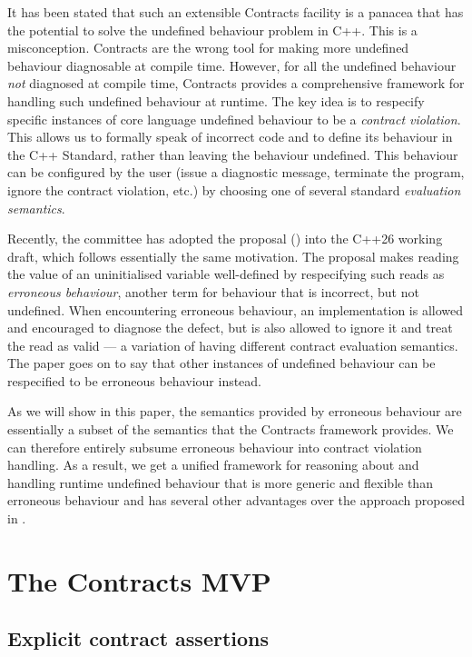 It has been stated that such an extensible Contracts facility is a panacea that has the potential to solve the undefined behaviour problem in C++. This is a misconception. Contracts are the wrong tool for making more undefined behaviour diagnosable at compile time. However, for all the undefined behaviour \emph{not} diagnosed at compile time, Contracts provides a comprehensive framework for handling such undefined behaviour at runtime. The key idea is to respecify specific instances of core language undefined behaviour to be a \emph{contract violation}. This allows us to formally speak of incorrect code and to define its behaviour in the C++ Standard, rather than leaving the behaviour undefined. This behaviour can be configured by the user (issue a diagnostic message, terminate the program, ignore the contract violation, etc.) by choosing one of several standard \emph{evaluation semantics}.

Recently, the committee has adopted the proposal (\cite{P2795R5}) into the C++26 working draft, which follows essentially the same motivation. The proposal makes reading the value of an uninitialised variable well-defined by respecifying such reads as \emph{erroneous behaviour}, another term for behaviour that is incorrect, but not undefined. When encountering erroneous behaviour, an implementation is allowed and encouraged to diagnose the defect, but is also allowed to ignore it and treat the read as valid --- a variation of having different contract evaluation semantics. The paper goes on to say that other instances of undefined behaviour can be respecified to be erroneous behaviour instead.

As we will show in this paper, the semantics provided by erroneous behaviour are essentially a subset of the semantics that the Contracts framework provides. We can therefore entirely subsume erroneous behaviour into contract violation handling. As a result, we get a unified framework for reasoning about and handling runtime undefined behaviour that is more generic and flexible than erroneous behaviour and has several other advantages over the approach proposed in \cite{P2795R5}.

\section{The Contracts MVP}
\subsection{Explicit contract assertions}

